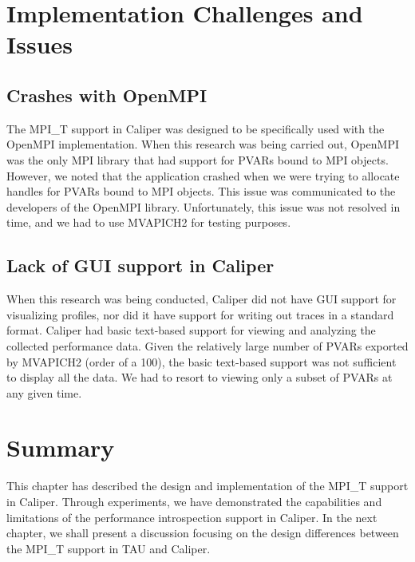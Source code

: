 \section{Implementation Challenges and Issues}
\subsection{Crashes with OpenMPI}
The MPI\_T support in Caliper was designed to be specifically used with the OpenMPI implementation. When this research was being carried out, OpenMPI was the only MPI library that had support for PVARs bound to MPI objects. However, we noted that the application crashed when we were trying to allocate handles for PVARs bound to MPI objects. This issue was communicated to the developers of the OpenMPI library. Unfortunately, this issue was not resolved in time, and we had to use MVAPICH2 for testing purposes.

\subsection{Lack of GUI support in Caliper}
When this research was being conducted, Caliper did not have GUI support for visualizing profiles, nor did it have support for writing out traces in a standard format. Caliper had basic text-based support for viewing and analyzing the collected performance data. Given the relatively large number of PVARs exported by MVAPICH2 (order of a 100), the basic text-based support was not sufficient to display all the data. We had to resort to viewing only a subset of PVARs at any given time.

\section{Summary}
This chapter has described the design and implementation of the MPI\_T support in Caliper. Through experiments, we have demonstrated the capabilities and limitations of the performance introspection support in Caliper. In the next chapter, we shall present a discussion focusing on the design differences between the MPI\_T support in TAU and Caliper. 
